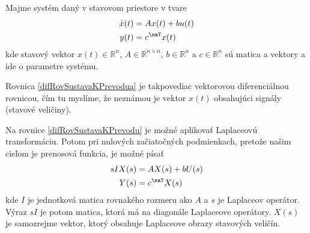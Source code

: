\documentclass[a4paper, 10pt, ]{article}
\begin{document}
Majme systém daný v stavovom priestore v tvare
\begin{subequations} \label{difRovSustavaKPrevodu}
    \begin{align} 
        \dot x(t) &= A x(t) + b u(t) \label{difRovSustavaKPrevodua}\\
        y(t) &= c^\naT x(t) 
    \end{align}
\end{subequations}
kde stavový vektor $x(t) \in \mathbb R^n$, $A \in \mathbb R^{n \times n}$, $b \in \mathbb R^n$ a $c \in \mathbb R^n$ sú matica a vektory a ide o parametre systému. 

Rovnica \eqref{difRovSustavaKPrevodua} je takpovediac vektorovou diferenciálnou rovnicou, čím tu myslíme, že neznámou je vektor $x(t)$ obsahujúci signály (stavové veličiny).

Na rovnice \eqref{difRovSustavaKPrevodu} je možné aplikovať Laplaceovú transformáciu. Potom pri nulových začiatočných podmienkach, pretože našim cieľom je prenosová funkcia, je možné písať
\begin{subequations}
    \begin{align}
        s I X(s) &= A X(s) + b U(s) \label{SRovSustavaKPrevodua} \\
        Y(s) &= c^\naT X(s) \label{SRovSustavaKPrevodub}
    \end{align}
\end{subequations}
kde $I$ je jednotková matica rovnakého rozmeru ako $A$ a $s$ je Laplaceov operátor. Výraz $s I$ je potom matica, ktorá má na diagonále Laplaceove operátory. $X(s)$ je samozrejme vektor, ktorý obsahuje Laplaceove obrazy stavových veličín.
\end{document}
